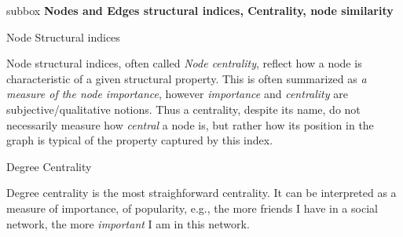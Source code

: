 \documentclass[a4paper,11pt]{book}
\begin{document}

\newpage



\begin{subbox}{subbox}{}
\centering
\Large{\textbf{Nodes and Edges structural indices, Centrality, node similarity}}
\end{subbox}















\begin{textbox}{Node Structural indices}

Node structural indices, often called \textit{Node centrality}, reflect how a node is characteristic of a given structural property. This is often summarized as \textit{a measure of the node importance}, however \textit{importance} and \textit{centrality} are subjective/qualitative notions. Thus a centrality, despite its name, do not necessarily measure how \textit{central} a node is, but rather how its position in the graph is typical of the property captured by this index.

\end{textbox}













\begin{textbox}{Degree Centrality}

Degree centrality is the most straighforward centrality. It can be interpreted as a measure of importance, of popularity, e.g., the more friends I have in a social network, the more \textit{important} I am in this network.

\end{textbox}
\end{document}
